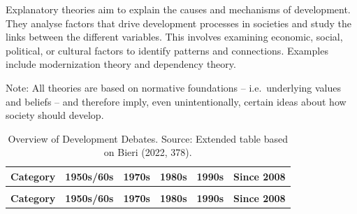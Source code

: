 \documentclass[
  a4paper,
  DIV=11,
  numbers=noendperiod,
  oneside,
  openany]{scrreprt}
\begin{document}
Explanatory theories aim to explain the causes and mechanisms of
development. They analyse factors that drive development processes in
societies and study the links between the different variables. This
involves examining economic, social, political, or cultural factors to
identify patterns and connections. Examples include modernization theory
and dependency theory.

Note: All theories are based on normative foundations -- i.e.~underlying
values and beliefs -- and therefore imply, even unintentionally, certain
ideas about how society should develop.

\begingroup\fontsize{8}{10}\selectfont

\begin{longtable}[t]{>{\raggedright\arraybackslash}p{1.6cm}>{\raggedright\arraybackslash}p{2.3cm}>{\raggedright\arraybackslash}p{2.3cm}>{\raggedright\arraybackslash}p{2.3cm}>{\raggedright\arraybackslash}p{2.3cm}>{\raggedright\arraybackslash}p{2.3cm}}

\caption{\label{tbl-development-theories}Overview of Development
Debates. Source: Extended table based on Bieri (2022, 378).}

\tabularnewline

\toprule
\textbf{Category} & \textbf{1950s/60s} & \textbf{1970s} & \textbf{1980s} & \textbf{1990s} & \textbf{Since 2008}\\
\midrule
\endfirsthead
\multicolumn{6}{@{}l}{\textit{(continued)}}\\
\toprule
\textbf{Category} & \textbf{1950s/60s} & \textbf{1970s} & \textbf{1980s} & \textbf{1990s} & \textbf{Since 2008}\\
\midrule
\endhead


\end{longtable}
\end{document}
